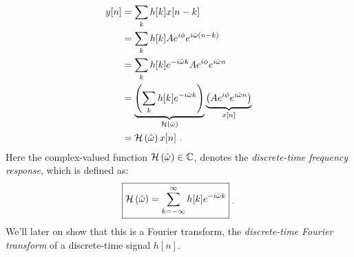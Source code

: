 \begin{align}
    y[n] & = \sum_{k} h[k]x[n-k]                                                                                                               \\
         & = \sum_{k} h[k] A e^{i\phi} e^{i\hat{\omega}(n-k)}                                                                                  \\
         & = \sum_{k} h[k] e^{-i\hat{\omega}k} A e^{i\phi} e^{i\hat{\omega}n}                                                                  \\
         & = \underbrace{\left(\sum_{k} h[k] e^{-i\hat{\omega}k}\right)}_{\mathcal{H}\left(\hat{\omega}\right)} \underbrace{\left(A e^{i\phi} e^{i\hat{\omega}n}\right)}_{x[n]} \\
         & = \mathcal{H}\left(\hat{\omega}\right) x[n] \,\,. \label{eq:eig_dt}
\end{align}
Here the complex-valued function $\mathcal{H}\left(\hat{\omega}\right) \in \mathbb{C}$, denotes
the \emph{discrete-time frequency response}, which is defined as:
\begin{equation}
    \boxed{
    \mathcal{H}\left(\hat{\omega}\right) = \sum_{k=-\infty}^{\infty} h[k]e^{-i\hat{\omega}k}
    } \,\, _.
    \label{eq:dt_fr}
\end{equation}
We'll later on show that this is a Fourier transform,
the \emph{discrete-time Fourier transform} of a discrete-time signal
$h[n]$. %



